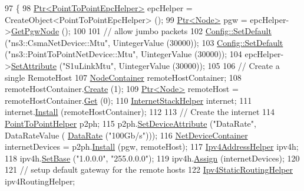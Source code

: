 \begin{DoxyCode}
97 \{
98   \hyperlink{classns3_1_1Ptr}{Ptr<PointToPointEpcHelper>} epcHelper = CreateObject<PointToPointEpcHelper> ();
99   \hyperlink{classns3_1_1Ptr}{Ptr<Node>} pgw = epcHelper->\hyperlink{classns3_1_1PointToPointEpcHelper_a828ac04ae81b0e323f9ccfc08bcacf21}{GetPgwNode} ();
100 
101   \textcolor{comment}{// allow jumbo packets}
102   \hyperlink{group__config_ga2e7882df849d8ba4aaad31c934c40c06}{Config::SetDefault} (\textcolor{stringliteral}{"ns3::CsmaNetDevice::Mtu"}, UintegerValue (30000));
103   \hyperlink{group__config_ga2e7882df849d8ba4aaad31c934c40c06}{Config::SetDefault} (\textcolor{stringliteral}{"ns3::PointToPointNetDevice::Mtu"}, UintegerValue (30000));
104   epcHelper->\hyperlink{classns3_1_1ObjectBase_ac60245d3ea4123bbc9b1d391f1f6592f}{SetAttribute} (\textcolor{stringliteral}{"S1uLinkMtu"}, UintegerValue (30000));
105   
106   \textcolor{comment}{// Create a single RemoteHost}
107   \hyperlink{classns3_1_1NodeContainer}{NodeContainer} remoteHostContainer;
108   remoteHostContainer.\hyperlink{classns3_1_1NodeContainer_a787f059e2813e8b951cc6914d11dfe69}{Create} (1);
109   \hyperlink{classns3_1_1Ptr}{Ptr<Node>} remoteHost = remoteHostContainer.\hyperlink{classns3_1_1NodeContainer_a9ed96e2ecc22e0f5a3d4842eb9bf90bf}{Get} (0);
110   \hyperlink{classns3_1_1InternetStackHelper}{InternetStackHelper} internet;
111   internet.\hyperlink{classns3_1_1InternetStackHelper_a6645b412f31283d2d9bc3d8a95cebbc0}{Install} (remoteHostContainer);
112 
113   \textcolor{comment}{// Create the internet}
114   \hyperlink{classns3_1_1PointToPointHelper}{PointToPointHelper} p2ph;
115   p2ph.\hyperlink{classns3_1_1PointToPointHelper_a4577f5ab8c387e5528af2e0fbab1152e}{SetDeviceAttribute} (\textcolor{stringliteral}{"DataRate"},  DataRateValue (
      \hyperlink{classns3_1_1DataRate}{DataRate} (\textcolor{stringliteral}{"100Gb/s"})));
116   \hyperlink{classns3_1_1NetDeviceContainer}{NetDeviceContainer} internetDevices = p2ph.\hyperlink{classns3_1_1PointToPointHelper_ab9162fea3e88722666fed1106df1f9ec}{Install} (pgw, remoteHost);  
117   \hyperlink{classns3_1_1Ipv4AddressHelper}{Ipv4AddressHelper} ipv4h;
118   ipv4h.\hyperlink{classns3_1_1Ipv4AddressHelper_acf7b16dd25bac67e00f5e25f90a9a035}{SetBase} (\textcolor{stringliteral}{"1.0.0.0"}, \textcolor{stringliteral}{"255.0.0.0"});
119   ipv4h.\hyperlink{classns3_1_1Ipv4AddressHelper_af8e7f4a1a7e74c00014a1eac445a27af}{Assign} (internetDevices);
120   
121   \textcolor{comment}{// setup default gateway for the remote hosts}
122   \hyperlink{classns3_1_1Ipv4StaticRoutingHelper}{Ipv4StaticRoutingHelper} ipv4RoutingHelper;

\end{DoxyCode}
